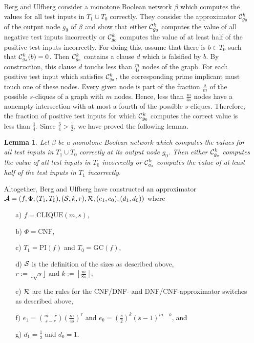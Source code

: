 \documentclass[11pt]{article}
\newtheorem{lem}{Lemma}
\begin{document}
\smallskip
Berg and Ulfberg \cite{BeUl} consider a monotone Boolean network $\beta$ which computes the values for all test
inputs in $T_1 \cup T_0$ correctly. They consider the approximator ${\cal C}_{g_0}^k$ of the output node $g_0$ of
$\beta$ and show that either ${\cal C}_{g_0}^k$ computes the value of all negative test inputs incorrectly or
${\cal C}_{g_0}^k$ computes the value of at least half of the positive test inputs incorrectly. For doing this,
assume that there is $b \in T_0$ such that ${\cal C}_{g_o}^k(b) = 0$. Then ${\cal C}_{g_0}^k$ contains a clause
$d$ which is falsified by $b$. By construction, this clause $d$ touchs less than $\frac{m}{4s}$ nodes of the graph.
For each positive test input which satisfies ${\cal C}_{g_0}^k$, the corresponding prime implicant must touch one
of these nodes. Every given node is part of the fraction $\frac{s}{m}$ of the possible
$s$-cliques of a graph with $m$ nodes. Hence, less than $\frac{m}{4s}$ nodes have a nonempty intersection
with at most a fourth of the possible $s$-cliques. Therefore, the fraction of positive test inputs for which
${\cal C}_{g_0}^k$ computes the correct value is less than $\frac{1}{4}$.
Since $\frac{3}{4} > \frac{1}{2}$, we have proved the following lemma.
\begin{lem} \label{lem4.3}
  Let $\beta$ be a monotone Boolean network which computes the values for all test inputs in $T_1 \cup T_0$
  correctly at its output node $g_0$. Then either ${\cal C}_{g_o}^k$ computes the value of all test inputs in
  $T_0$ incorrectly or ${\cal C}_{g_o}^k$ computes the value of at least half of the test inputs in $T_1$
  incorrectly.
\end{lem}

\smallskip
Altogether, Berg and Ulfberg have constructed an approximator
${\cal A} = (f,\Phi,(T_1,T_0),({\cal S},k,r),{\cal R},(e_1,e_0),(d_1,d_0))$ where
\begin{itemize}
\item[a)]
  $f = \mbox{CLIQUE}(m,s)$,
\item[b)]
  $\Phi = \mbox{CNF}$,
\item[c)]
  $T_1 = \mbox{PI}(f)$ and $T_0 = \mbox{GC}(f)$,
\item[d)]
  ${\cal S}$ is the definition of the sizes as described above,
  $r := \lfloor \sqrt{s}\rfloor \mbox{ and } k := \left\lfloor \frac{m}{8s}\right\rfloor$,
\item[e)]
  ${\cal R}$ are the rules for the CNF/DNF- and DNF/CNF-approximator switches as described above,
\item[f)]
  $e_1 = {m - r \choose s - r}(\frac{m}{4s})^{r}$ and $e_0 = \left(\frac{s}{2}\right)^k(s-1)^{m-k}$, and
\item[g)]
  $d_1 = \frac{1}{2}$ and $d_0 = 1$.
\end{itemize}
\end{document}
